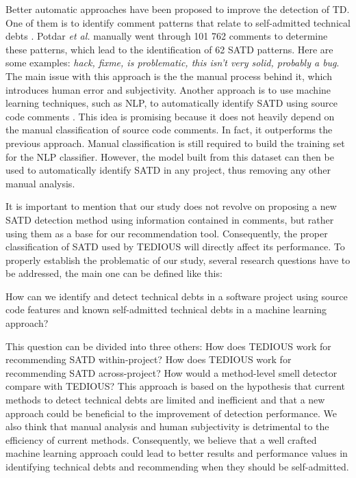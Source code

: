 Better automatic approaches have been proposed to improve the detection of \ac{TD}. One of them is to identify comment patterns that relate to self-admitted technical debts \citep{PotdarS14}. Potdar \emph{et al.} manually went through 101 762 comments to determine these patterns, which lead to the identification of 62 \ac{SATD} patterns. Here are some examples: \emph{hack, fixme, is problematic, this isn't very solid, probably a bug}. The main issue with this approach is the the manual process behind it, which introduces human error and subjectivity. Another approach is to use machine learning techniques, such as \ac{NLP}, to automatically identify \ac{SATD} using source code comments \citep{MaldonadoNLP}. This idea is promising because it does not heavily depend on the manual classification of source code comments. In fact, it outperforms the previous approach. Manual classification is still required to build the training set for the NLP classifier. However, the model built from this dataset can then be used to automatically identify \ac{SATD} in any project, thus removing any other manual analysis. \par

It is important to mention that our study does not revolve on proposing a new \ac{SATD} detection method using information contained in comments, but rather using them as a base for our recommendation tool. Consequently, the proper classification of \ac{SATD} used by \ac{TEDIOUS} will directly affect its performance. To properly establish the problematic of our study, several research questions have to be addressed, the main one can be defined like this:  \par

\begin{framed}
	How can we identify and detect technical debts in a software project using source code features and known self-admitted technical debts in a machine learning approach?
\end{framed}

This question can be divided into three others: How does \ac{TEDIOUS} work for recommending \ac{SATD} within-project? How does \ac{TEDIOUS} work for recommending SATD across-project? How would a method-level smell detector compare with \ac{TEDIOUS}? This approach is based on the hypothesis that current methods to detect technical debts are limited and inefficient and that a new approach could be beneficial to the improvement of detection performance. We also think that manual analysis and human subjectivity is detrimental to the efficiency of current methods. Consequently, we believe that a well crafted machine learning approach could lead to better results and performance values in identifying technical debts and recommending when they should be self-admitted. \par


